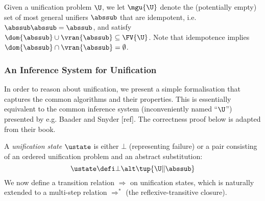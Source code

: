 Given a unification problem $\U$, we let $\mgu{\U}$ denote the (potentially empty) set of most general unifiers $\abssub$ that are idempotent, i.e. $\abssub \abssub = \abssub$, and
satisfy $\dom{\abssub} \cup \vran{\abssub} \subseteq \FV{\U}$. Note that idempotence implies $\dom{\abssub} \cap \vran{\abssub} = \emptyset$.


\subsubsection*{An Inference System for Unification}

In order to reason about unification, we present a simple formalisation that captures the common algorithms and their properties.
This is essentially equivalent to the common inference system (inconveniently named ``$\U$'') presented by e.g. Baader and Snyder [ref].
The correctness proof below is adapted from their book.

A \emph{unification state} $\ustate$ is either $\bot$ (representing failure) or a pair consisting of an ordered unification problem and an abstract substitution:
\[ \ustate \defi \bot \alt \tup{\U \| \abssub} \]
We now define a transition relation $\Longrightarrow$ on unification states, which is naturally extended to a multi-step relation $\Longrightarrow^*$ (the reflexive-transitive closure).


